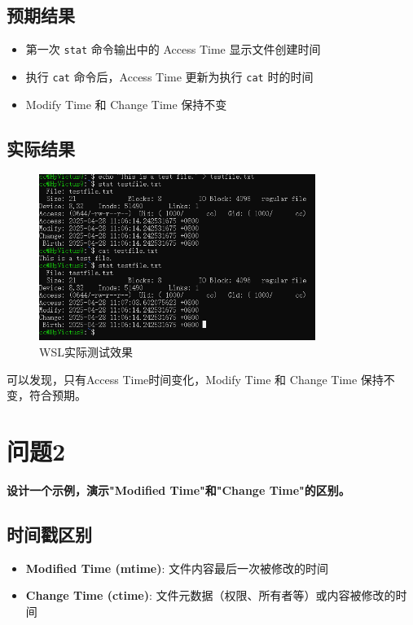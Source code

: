 \documentclass[12pt,hyperref,a4paper,UTF8]{ctexart}
\begin{document}
\subsection{预期结果}
\begin{itemize}
    \item 第一次 \texttt{stat} 命令输出中的 Access Time 显示文件创建时间
    \item 执行 \texttt{cat} 命令后，Access Time 更新为执行 \texttt{cat} 时的时间
    \item Modify Time 和 Change Time 保持不变
\end{itemize}

\subsection{实际结果}

\begin{figure}[H] %
    \centering
    \includegraphics[width=0.8\textwidth]{figures/L1.png} %
    \caption{WSL实际测试效果} %
    \label{fig:example} %
\end{figure}

可以发现，只有Access Time时间变化，Modify Time 和 Change Time 保持不变，符合预期。


\section{问题2}
\textbf{设计一个示例，演示"Modified Time"和"Change Time"的区别。}

\subsection{时间戳区别}
\begin{itemize}
    \item \textbf{Modified Time (mtime)}: 文件内容最后一次被修改的时间
    \item \textbf{Change Time (ctime)}: 文件元数据（权限、所有者等）或内容被修改的时间
\end{itemize}
\end{document}
